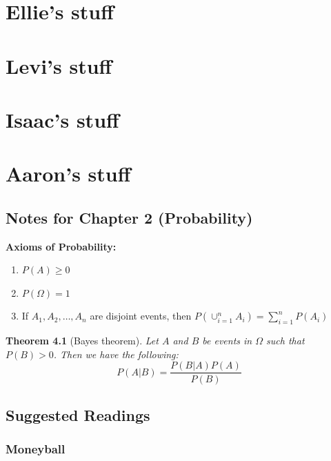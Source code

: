 \documentclass[
]{book}
\newtheorem{theorem}{Theorem}[chapter]
\theoremstyle{definition}
\theoremstyle{definition}
\theoremstyle{definition}
\theoremstyle{definition}
\theoremstyle{remark}
\begin{document}
\hypertarget{ellies-stuff}{%
\chapter{Ellie's stuff}\label{ellies-stuff}}

\hypertarget{levis-stuff}{%
\chapter{Levi's stuff}\label{levis-stuff}}

\hypertarget{isaacs-stuff}{%
\chapter{Isaac's stuff}\label{isaacs-stuff}}

\hypertarget{aarons-stuff}{%
\chapter{Aaron's stuff}\label{aarons-stuff}}

\hypertarget{notes-for-chapter-2-probability}{%
\section{Notes for Chapter 2 (Probability)}\label{notes-for-chapter-2-probability}}

\textbf{Axioms of Probability:}

\begin{enumerate}
\def\labelenumi{\arabic{enumi}.}
\item
  \(P(A) \geq 0\)
\item
  \(P(\Omega)=1\)
\item
  If \(A_1, A_2, \ldots, A_n\) are disjoint events, then \(P(\cup_{i=1}^n A_i) = \sum_{i=1}^n P(A_i)\)
\end{enumerate}

\begin{theorem}[Bayes theorem]
Let \(A\) and \(B\) be events in \(\Omega\) such that \(P(B)>0\). Then we have the following:
\[
P(A|B) = \frac{P(B|A)P(A)}{P(B)}
\]
\end{theorem}

\hypertarget{suggested-readings}{%
\section{Suggested Readings}\label{suggested-readings}}

\hypertarget{moneyball}{%
\subsection{Moneyball}\label{moneyball}}
\end{document}
